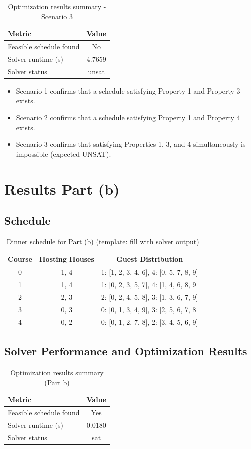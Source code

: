 \documentclass{article}
\begin{document}
\begin{table}[H]
\centering
\caption{Optimization results summary - Scenario 3}
\begin{tabular}{l c}
\toprule
Metric & Value \\
\midrule
Feasible schedule found & No \\
Solver runtime (s) & 4.7659 \\
Solver status & unsat \\
\bottomrule
\end{tabular}
\end{table}

\begin{itemize}
    \item Scenario 1 confirms that a schedule satisfying Property 1 and Property 3 exists.
    \item Scenario 2 confirms that a schedule satisfying Property 1 and Property 4 exists.
    \item Scenario 3 confirms that satisfying Properties 1, 3, and 4 simultaneously is impossible (expected UNSAT).
\end{itemize}


\section{Results Part (b)}

\subsection{Schedule}
\begin{table}[H]
\centering
\caption{Dinner schedule for Part (b) (template: fill with solver output)}
\small
\begin{tabular}{c|c|c}
\toprule
Course & Hosting Houses & Guest Distribution \\
\midrule
0 & 1, 4 & 1: [1, 2, 3, 4, 6], 4: [0, 5, 7, 8, 9] \\
1 & 1, 4 & 1: [0, 2, 3, 5, 7], 4: [1, 4, 6, 8, 9] \\
2 & 2, 3 & 2: [0, 2, 4, 5, 8], 3: [1, 3, 6, 7, 9] \\
3 & 0, 3 & 0: [0, 1, 3, 4, 9], 3: [2, 5, 6, 7, 8] \\
4 & 0, 2 & 0: [0, 1, 2, 7, 8], 2: [3, 4, 5, 6, 9] \\
\bottomrule
\end{tabular}
\end{table}

\subsection{Solver Performance and Optimization Results}
\begin{table}[H]
\centering
\caption{Optimization results summary (Part b)}
\begin{tabular}{l c}
\toprule
Metric & Value \\
\midrule
Feasible schedule found & Yes \\
Solver runtime (s) & 0.0180 \\
Solver status & sat \\
\bottomrule
\end{tabular}
\end{table}
\end{document}

